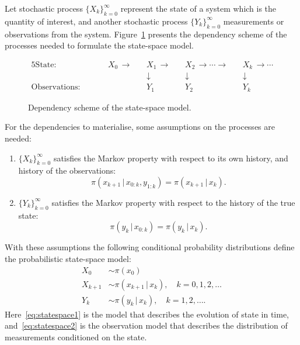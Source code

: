 Let stochastic process $\{X_k\}_{k=0}^{\infty}$ represent the state of a system which is the quantity of interest, and another stochastic process $\{Y_k\}_{k=0}^{\infty}$ measurements or observations from the system.
Figure~\ref{fig:statespacedependency} presents the dependency scheme of the processes needed to formulate the state-space model.
\begin{figure}[h]
    \begin{alignat*}{5}
        \text{State:}& \quad && X_0 \, \rightarrow \, && X_1 \, \rightarrow \, && X_2 \,\rightarrow \cdots \rightarrow \, && X_k \, \rightarrow \cdots \\
                     & &&  && \downarrow && \downarrow && \downarrow \\
        \text{Observations:}& \quad && && Y_1 && Y_2 && Y_k
    \end{alignat*}
    \caption{\label{fig:statespacedependency}Dependency scheme of the state-space model.}
\end{figure}
For the dependencies to materialise, some assumptions on the processes are needed:
\begin{enumerate}
    \item 
        $\{X_k\}_{k=0}^{\infty}$ satisfies the Markov property with respect to its own history, and history of the observations:
        \begin{equation*}
            \pi (x_{k+1} \, \vert \, x_{0:k}, y_{1:k}) = \pi (x_{k+1} \, \vert \, x_k).
        \end{equation*}
    \item
        $\{Y_k\}_{k=0}^{\infty}$ satisfies the Markov property with respect to the history of the true state:
        \begin{equation*}
            \pi (y_k \, \vert \, x_{0:k}) = \pi (y_k \, \vert \, x_k).
        \end{equation*}
\end{enumerate}
With these assumptions the following conditional probability distributions define the probabilistic state-space model:
\begin{subequations}\label{eq:statespace}
    \begin{align}
        X_0 &\sim \pi (x_0)\\
        X_{k+1} &\sim \pi (x_{k+1} \, \vert \, x_{k}), \quad k = 0,1,2,\dots \label{eq:statespace1}\\
        Y_k &\sim \pi (y_k \, \vert \, x_k), \quad k = 1,2,\dots. \label{eq:statespace2}
    \end{align}
\end{subequations}
Here~\eqref{eq:statespace1} is the model that describes the evolution of state in time, and~\eqref{eq:statespace2} is the observation model that describes the distribution of measurements conditioned on the state.

